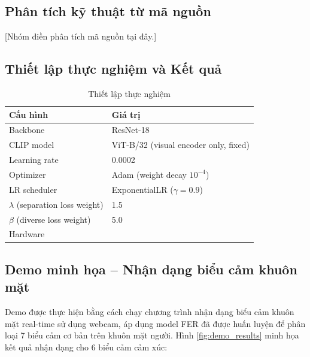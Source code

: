 \documentclass[12pt,a4paper]{article}
\let\oldtextbf\textbf
\renewcommand{\textbf}[1]{\oldtextbf{\textcolor{hcmublue}{#1}}}
\begin{document}
\subsection{Phân tích kỹ thuật từ mã nguồn}


[Nhóm điền phân tích mã nguồn tại đây.]

\subsection{Thiết lập thực nghiệm và Kết quả}

\begin{table}[H]
\centering
\begin{tabular}{ll}
\toprule
\textbf{Cấu hình} & \textbf{Giá trị} \\
\midrule
Backbone & ResNet-18 \\
CLIP model & ViT-B/32 (visual encoder only, fixed) \\
Learning rate & 0.0002 \\
Optimizer & Adam (weight decay $10^{-4}$) \\
LR scheduler & ExponentialLR ($\gamma = 0.9$) \\
$\lambda$ (separation loss weight) & 1.5 \\
$\beta$ (diverse loss weight) & 5.0 \\
Hardware & \\ %
\bottomrule
\end{tabular}
\caption{Thiết lập thực nghiệm}
\label{tab:exp_setup}
\end{table}


\subsection{Demo minh họa -- Nhận dạng biểu cảm khuôn mặt}

Demo được thực hiện bằng cách chạy chương trình nhận dạng biểu cảm khuôn mặt real-time sử dụng webcam, áp dụng model FER đã được huấn luyện để phân loại 7 biểu cảm cơ bản trên khuôn mặt người. Hình \ref{fig:demo_results} minh họa kết quả nhận dạng cho 6 biểu cảm cảm xúc:
\end{document}
